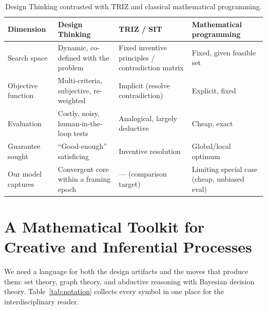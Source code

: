 \documentclass[11pt]{article}
\begin{document}
\begin{table}[!tb]
\centering
\caption{Design Thinking contrasted with TRIZ and classical mathematical programming.}
\label{tab:frameworks}
\footnotesize
\setlength{\tabcolsep}{5pt}
\begin{tabularx}{\textwidth}{@{}l >{\raggedright\arraybackslash}X >{\raggedright\arraybackslash}X >{\raggedright\arraybackslash}X@{}}
\toprule
\textbf{Dimension} & \textbf{Design Thinking} & \textbf{TRIZ / SIT} & \textbf{Mathematical programming} \\
\midrule
Search space & Dynamic, co-defined with the problem & Fixed inventive principles / contradiction matrix & Fixed, given feasible set \\
Objective function & Multi-criteria, subjective, re-weighted & Implicit (resolve contradiction) & Explicit, fixed \\
Evaluation & Costly, noisy, human-in-the-loop tests & Analogical, largely deductive & Cheap, exact \\
Guarantee sought & ``Good-enough'' satisficing & Inventive resolution & Global/local optimum \\
Our model captures & Convergent core within a framing epoch & --- (comparison target) & Limiting special case (cheap, unbiased eval) \\
\bottomrule
\end{tabularx}
\end{table}

\section{A Mathematical Toolkit for Creative and Inferential Processes}
\label{sec:toolkit}

We need a language for both the design artifacts and the moves that produce them: set theory, graph theory, and abductive reasoning with Bayesian decision theory. Table~\ref{tab:notation} collects every symbol in one place for the interdisciplinary reader.
\end{document}
